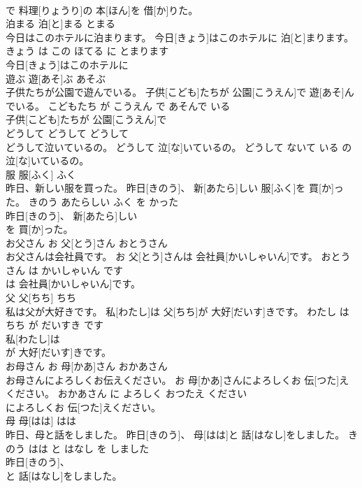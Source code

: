 \documentclass[8pt]{extreport}
\begin{document}
\begin{CJK}{UTF8}{min}
\\	で 料理[りょうり]の 本[ほん]を 借[か]りた。			
\\	泊まる	泊[と]まる	とまる	
\\	今日はこのホテルに泊まります。	今日[きょう]はこのホテルに 泊[と]まります。	きょう は この ほてる に とまります	
\\	今日[きょう]はこのホテルに
\\	遊ぶ	遊[あそ]ぶ	あそぶ	
\\	子供たちが公園で遊んでいる。	子供[こども]たちが 公園[こうえん]で 遊[あそ]んでいる。	こどもたち が こうえん で あそんで いる	
\\	子供[こども]たちが 公園[こうえん]で
\\	どうして	どうして	どうして	
\\	どうして泣いているの。	どうして 泣[な]いているの。	どうして ないて いる の	
\\	泣[な]いているの。			
\\	服	服[ふく]	ふく	
\\	昨日、新しい服を買った。	昨日[きのう]、 新[あたら]しい 服[ふく]を 買[か]った。	きのう あたらしい ふく を かった	
\\	昨日[きのう]、 新[あたら]しい
\\	を 買[か]った。			
\\	お父さん	お 父[とう]さん	おとうさん	
\\	お父さんは会社員です。	お 父[とう]さんは 会社員[かいしゃいん]です。	おとうさん は かいしゃいん です	
\\	は 会社員[かいしゃいん]です。			
\\	父	父[ちち]	ちち	
\\	私は父が大好きです。	私[わたし]は 父[ちち]が 大好[だいす]きです。	わたし は ちち が だいすき です	
\\	私[わたし]は
\\	が 大好[だいす]きです。			
\\	お母さん	お 母[かあ]さん	おかあさん	
\\	お母さんによろしくお伝えください。	お 母[かあ]さんによろしくお 伝[つた]えください。	おかあさん に よろしく おつたえ ください	
\\	によろしくお 伝[つた]えください。			
\\	母	母[はは]	はは	
\\	昨日、母と話をしました。	昨日[きのう]、 母[はは]と 話[はなし]をしました。	きのう はは と はなし を しました	
\\	昨日[きのう]、
\\	と 話[はなし]をしました。			

\end{CJK}
\end{document}
